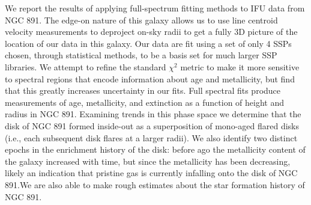 \begin{chabstract}

  We report the results of applying full-spectrum fitting methods to
  IFU data from NGC 891. The edge-on nature of this galaxy allows us
  to use line centroid velocity measurements to deproject on-sky radii
  to get a fully 3D picture of the location of our data in this
  galaxy. Our data are fit using a set of only 4 SSPs chosen, through
  statistical methods, to be a basis set for much larger SSP
  libraries. We attempt to refine the standard $\chi^2$ metric to make
  it more sensitive to spectral regions that encode information about
  age and metallicity, but find that this greatly increases
  uncertainty in our fits. Full spectral fits produce measurements of
  age, metallicity, and extinction as a function of height and radius
  in NGC 891. Examining trends in this phase space we determine that
  the disk of NGC 891 formed inside-out as a superposition of mono-aged
  flared disks (i.e., each subsequent disk flares at a larger
  radii). We also identify two distinct epochs in the enrichment
  history of the disk: before  ago the metallicity content
  of the galaxy increased with time, but since  the
  metallicity has been decreasing, likely an indication that pristine
  gas is currently infalling onto the disk of NGC 891.We are also able
  to make rough estimates about the star formation history of NGC 891.



\end{chabstract}























